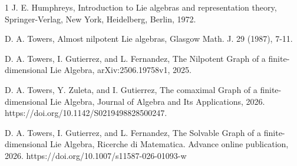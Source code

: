\documentclass[11pt]{amsart}
\theoremstyle{plain}
\begin{document}
\begin{thebibliography}{1}
 J. E. Humphreys, Introduction to Lie algebras and representation theory, Springer-Verlag, New York, Heidelberg, Berlin, 1972.

 D. A. Towers, Almost nilpotent Lie algebras, Glasgow Math. J. 29 (1987), 7-11.





 D. A. Towers, I. Gutierrez, and L. Fernandez, The Nilpotent Graph of a finite-dimensional Lie Algebra,  arXiv:2506.19758v1, 2025.

 D. A. Towers, Y. Zuleta, and I. Gutierrez, The comaximal Graph of a finite-dimensional Lie Algebra, Journal of Algebra and Its Applications, 2026. https://doi.org/10.1142/S0219498828500247.

 D. A. Towers, I. Gutierrez, and L. Fernandez, The Solvable Graph of a finite-dimensional Lie Algebra, Ricerche di Matematica. Advance online publication, 2026. https://doi.org/10.1007/s11587-026-01093-w


\end{thebibliography}
\end{document}
